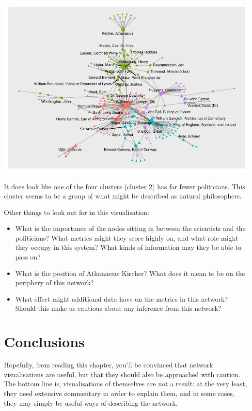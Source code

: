 \documentclass[
]{book}
\begin{document}
\includegraphics{_main_files/figure-latex/unnamed-chunk-68-1.pdf}

It does look like one of the four clusters (cluster 2) has far fewer politicians. This cluster seems to be a group of what might be described as natural philosophers.

Other things to look out for in this visualisation:

\begin{itemize}
\item
  What is the importance of the nodes sitting in between the scientists and the politicians? What metrics might they score highly on, and what role might they occupy in this system? What kinds of information may they be able to pass on?
\item
  What is the position of Athanasius Kircher? What does it mean to be on the periphery of this network?
\item
  What effect might additional data have on the metrics in this network? Should this make us cautious about any inference from this network?
\end{itemize}

\hypertarget{conclusions-2}{%
\section{Conclusions}\label{conclusions-2}}

Hopefully, from reading this chapter, you'll be convinced that network visualisations are useful, but that they should also be approached with caution. The bottom line is, visualisations of themselves are not a result: at the very least, they need extensive commentary in order to explain them, and in some cases, they may simply be useful ways of describing the network.
\end{document}
